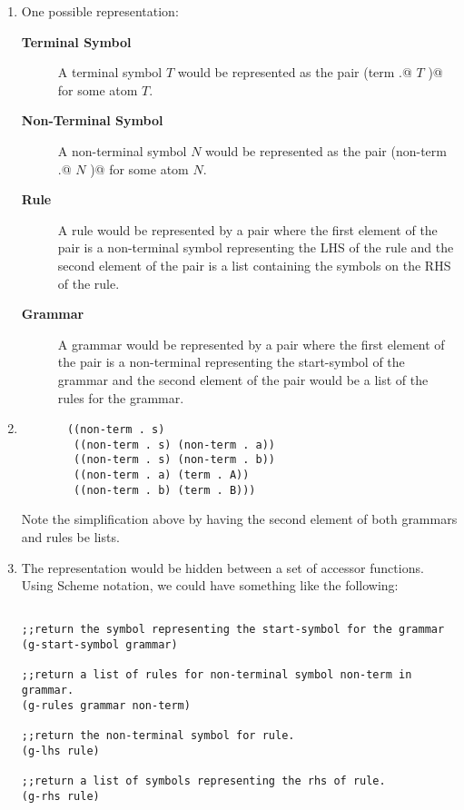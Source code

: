 \documentclass[12pt]{article}
\begin{document}
\begin{enumerate}
\begin{enumerate}

\item One possible representation:

  \begin{description}
  \item[\textbf{Terminal Symbol}] A terminal symbol $T$ would be represented
    as the pair \verb@(term .@ $T$ \verb@)@ for some atom $T$. 
  \item[\textbf{Non-Terminal Symbol}] A non-terminal symbol $N$ would be represented
    as the pair \verb@(non-term .@ $N$ \verb@)@ for some atom $N$.
  \item[\textbf{Rule}] A rule would be represented by a pair where
    the first element of the pair is a non-terminal symbol representing the
    LHS of the rule and the second element of the pair is a list
    containing the symbols on the RHS of the rule.

  \item[\textbf{Grammar}] A grammar would be represented by a pair
    where the first element of the pair is a non-terminal representing
    the start-symbol of the grammar and the second element of the pair would
    be a list of the rules for the grammar.
  \end{description}

\item
\begin{verbatim}
       ((non-term . s)
        ((non-term . s) (non-term . a))
        ((non-term . s) (non-term . b))
        ((non-term . a) (term . A))
        ((non-term . b) (term . B)))  
\end{verbatim}
Note the simplification above by having the second element of both grammars
and rules be lists.

\item The representation would be hidden between a set of accessor
  functions.  Using Scheme notation, we could have something like the
  following:

\begin{verbatim}

;;return the symbol representing the start-symbol for the grammar
(g-start-symbol grammar)

;;return a list of rules for non-terminal symbol non-term in grammar.
(g-rules grammar non-term)

;;return the non-terminal symbol for rule.
(g-lhs rule)
  
;;return a list of symbols representing the rhs of rule.
(g-rhs rule)


\end{verbatim}
\end{enumerate}
\end{enumerate}
\end{document}
